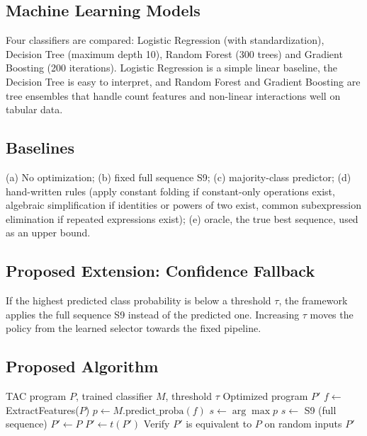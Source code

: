 \documentclass[12pt,a4paper]{article}
\begin{document}
\subsection{Machine Learning Models}

Four classifiers are compared: Logistic Regression (with standardization),
Decision Tree (maximum depth 10), Random Forest (300 trees) and Gradient
Boosting (200 iterations). Logistic Regression is a simple linear baseline, the Decision Tree is easy to interpret, and Random Forest and Gradient Boosting are tree ensembles that handle count features and non-linear interactions well on tabular data.

\subsection{Baselines}

(a) No optimization; (b) fixed full sequence S9; (c) majority-class predictor;
(d) hand-written rules (apply constant folding if constant-only operations
exist, algebraic simplification if identities or powers of two exist, common
subexpression elimination if repeated expressions exist); (e) oracle, the true
best sequence, used as an upper bound.

\subsection{Proposed Extension: Confidence Fallback}

If the highest predicted class probability is below a threshold $\tau$, the
framework applies the full sequence S9 instead of the predicted one. Increasing
$\tau$ moves the policy from the learned selector towards the fixed pipeline.

\subsection{Proposed Algorithm}

\begin{algorithm}[H]
\caption{ML-Driven Technique Selection and Optimization}
\label{alg:main}
\begin{algorithmic}[1]
\Require TAC program $P$, trained classifier $M$, threshold $\tau$
\Ensure Optimized program $P'$
\State $f \gets$ ExtractFeatures($P$)
\State $p \gets M.\text{predict\_proba}(f)$
\State $s \gets \arg\max p$
    \State $s \gets$ S9 (full sequence)
\EndIf
\State $P' \gets P$
    \State $P' \gets t(P')$
\EndFor
\State Verify $P'$ is equivalent to $P$ on random inputs
\State \Return $P'$
\end{algorithmic}
\end{algorithm}
\end{document}

